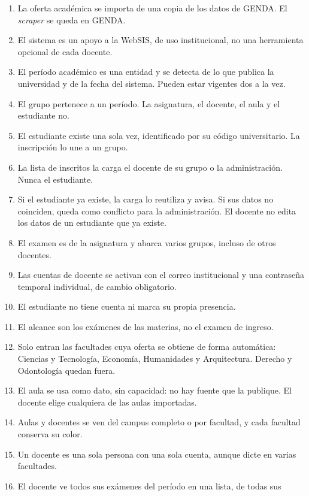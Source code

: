 \documentclass[11pt,letterpaper]{article}
\begin{document}
\begin{enumerate}
  \item La oferta académica se importa de una copia de los datos de GENDA. El
        \emph{scraper} se queda en GENDA.
  \item El sistema es un apoyo a la WebSIS, de uso institucional, no una herramienta
        opcional de cada docente.
  \item El período académico es una entidad y se detecta de lo que publica la
        universidad y de la fecha del sistema. Pueden estar vigentes dos a la vez.
  \item El grupo pertenece a un período. La asignatura, el docente, el aula y el
        estudiante no.
  \item El estudiante existe una sola vez, identificado por su código universitario. La
        inscripción lo une a un grupo.
  \item La lista de inscritos la carga el docente de su grupo o la administración. Nunca
        el estudiante.
  \item Si el estudiante ya existe, la carga lo reutiliza y avisa. Si sus datos no
        coinciden, queda como conflicto para la administración. El docente no edita los
        datos de un estudiante que ya existe.
  \item El examen es de la asignatura y abarca varios grupos, incluso de otros docentes.
  \item Las cuentas de docente se activan con el correo institucional y una contraseña
        temporal individual, de cambio obligatorio.
  \item El estudiante no tiene cuenta ni marca su propia presencia.
  \item El alcance son los exámenes de las materias, no el examen de ingreso.
  \item Solo entran las facultades cuya oferta se obtiene de forma automática: Ciencias
        y Tecnología, Economía, Humanidades y Arquitectura. Derecho y Odontología quedan
        fuera.
  \item El aula se usa como dato, sin capacidad: no hay fuente que la publique. El
        docente elige cualquiera de las aulas importadas.
  \item Aulas y docentes se ven del campus completo o por facultad, y cada facultad
        conserva su color.
  \item Un docente es una sola persona con una sola cuenta, aunque dicte en varias
        facultades.
  \item El docente ve todos sus exámenes del período en una lista, de todas sus

\end{enumerate}
\end{document}
